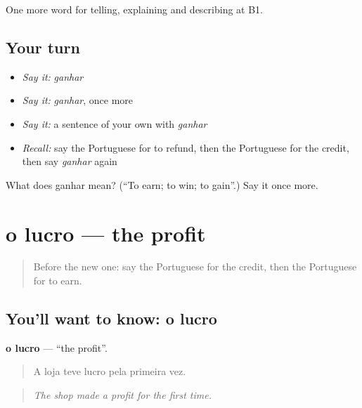 \begin{grammarlens}[title={What you've built}]
One more word for telling, explaining and describing at B1.
\end{grammarlens}

\subsection*{Your turn}
\begin{itemize}
\raggedright
  \item \emph{Say it:} \emph{ganhar}
  \item \emph{Say it:} \emph{ganhar}, once more
  \item \emph{Say it:} a sentence of your own with \emph{ganhar}
  \item \emph{Recall:} say the Portuguese for to refund, then the Portuguese for the credit, then say \emph{ganhar} again
\end{itemize}

\begin{tcolorbox}[breakable,colback=teal!4,colframe=teal!35!black,title={Before you move on}]
What does ganhar mean? (\textquotedblleft{}To earn; to win; to gain\textquotedblright{}.) Say it once more.
\end{tcolorbox}
\section[o lucro]{o lucro — the profit}

\label{lesson:PT-C395-lucro}



\begin{quote}
Before the new one: say the Portuguese for the credit, then the Portuguese for to earn.
\end{quote}

\subsection*{You'll want to know: o lucro}
\textbf{o lucro} — \textquotedblleft{}the profit\textquotedblright{}.

\begin{quote}
A loja teve lucro pela primeira vez.
\end{quote}

\begin{quote}
\emph{The shop made a profit for the first time.}
\end{quote}

